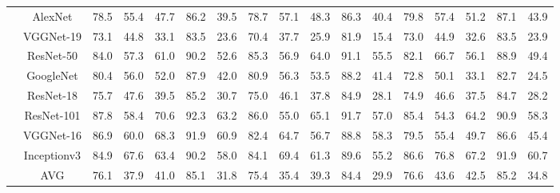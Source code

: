 \documentclass[12pt,italian]{article}
\begin{document}
\begin{tiny}
\begin{longtable}{lcccccccccccccccc}
& AlexNet & 78.5 & 55.4 & 47.7 & 86.2 & 39.5 & 78.7 & 57.1 & 48.3 & 86.3 & 40.4 & 79.8 & 57.4 & 51.2 & 87.1 & 43.9 \\ 
& VGGNet-19 & 73.1 & 44.8 & 33.1 & 83.5 & 23.6 & 70.4 & 37.7 & 25.9 & 81.9 & 15.4 & 73.0 & 44.9 & 32.6 & 83.5 & 23.9 \\ 
& ResNet-50 & 84.0 & 57.3 & 61.0 & 90.2 & 52.6 & 85.3 & 56.9 & 64.0 & 91.1 & 55.5 & 82.1 & 66.7 & 56.1 & 88.9 & 49.4 \\ 
& GoogleNet & 80.4 & 56.0 & 52.0 & 87.9 & 42.0 & 80.9 & 56.3 & 53.5 & 88.2 & 41.4 & 72.8 & 50.1 & 33.1 & 82.7 & 24.5 \\ 
& ResNet-18 & 75.7 & 47.6 & 39.5 & 85.2 & 30.7 & 75.0 & 46.1 & 37.8 & 84.9 & 28.1 & 74.9 & 46.6 & 37.5 & 84.7 & 28.2 \\ 
& ResNet-101 & 87.8 & 58.4 & 70.6 & 92.3 & 63.2 & 86.0 & 55.0 & 65.1 & 91.7 & 57.0 & 85.4 & 54.3 & 64.2 & 90.9 & 58.3 \\ 
& VGGNet-16 & 86.9 & 60.0 & 68.3 & 91.9 & 60.9 & 82.4 & 64.7 & 56.7 & 88.8 & 58.3 & 79.5 & 55.4 & 49.7 & 86.6 & 45.4 \\ 
& Inceptionv3 & 84.9 & 67.6 & 63.4 & 90.2 & 58.0 & 84.1 & 69.4 & 61.3 & 89.6 & 55.2 & 86.6 & 76.8 & 67.2 & 91.9 & 60.7 \\ 
\hline
& AVG & 76.1 & 37.9 & 41.0 & 85.1 & 31.8 & 75.4 & 35.4 & 39.3 & 84.4 & 29.9 & 76.6 & 43.6 & 42.5 & 85.2 & 34.8 \\ 
\hline
\bottomrule
\end{longtable} 

 \pagebreak 
\end{tiny} 
 
\end{document}
